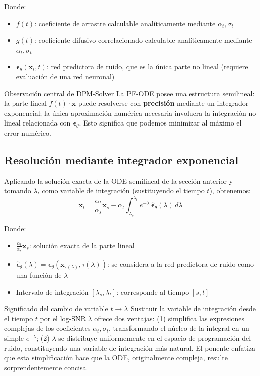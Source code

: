 \documentclass[a4paper]{article}
\begin{document}
Donde:
\begin{itemize}
    \item $f(t)$: coeficiente de arrastre calculable analíticamente mediante $\alpha_t, \sigma_t$
    \item $g(t)$: coeficiente difusivo correlacionado calculable analíticamente mediante $\alpha_t, \sigma_t$
    \item $\boldsymbol{\epsilon}_\theta(\mathbf{x}_t, t)$: red predictora de ruido, que es la única parte no lineal (requiere evaluación de una red neuronal)
\end{itemize}

\begin{importantbox}{Observación central de DPM-Solver}
La PF-ODE posee una estructura semilineal: la parte lineal $f(t) \cdot \mathbf{x}$ puede resolverse con \textbf{precisión} mediante un integrador exponencial; la única aproximación numérica necesaria involucra la integración no lineal relacionada con $\boldsymbol{\epsilon}_\theta$. Esto significa que podemos minimizar al máximo el error numérico.
\end{importantbox}

\subsection{Resolución mediante integrador exponencial}

Aplicando la solución exacta de la ODE semilineal de la sección anterior y tomando $\lambda_t$ como variable de integración (sustituyendo el tiempo $t$), obtenemos:
$$\mathbf{x}_t = \frac{\alpha_t}{\alpha_s} \mathbf{x}_s - \alpha_t \int_{\lambda_s}^{\lambda_t} e^{-\lambda}\, \hat{\boldsymbol{\epsilon}}_\theta(\lambda)\, d\lambda$$

Donde:
\begin{itemize}
    \item $\frac{\alpha_t}{\alpha_s} \mathbf{x}_s$: solución exacta de la parte lineal
    \item $\hat{\boldsymbol{\epsilon}}_\theta(\lambda) = \boldsymbol{\epsilon}_\theta(\mathbf{x}_{\tau(\lambda)}, \tau(\lambda))$: se considera a la red predictora de ruido como una función de $\lambda$
    \item Intervalo de integración $[\lambda_s, \lambda_t]$: corresponde al tiempo $[s, t]$
\end{itemize}

\begin{knowledgebox}{Significado del cambio de variable $t \to \lambda$}
Sustituir la variable de integración desde el tiempo $t$ por el log-SNR $\lambda$ ofrece dos ventajas: (1) simplifica las expresiones complejas de los coeficientes $\alpha_t, \sigma_t$, transformando el núcleo de la integral en un simple $e^{-\lambda}$; (2) $\lambda$ se distribuye uniformemente en el espacio de programación del ruido, constituyendo una variable de integración más natural. El ponente enfatiza que esta simplificación hace que la ODE, originalmente compleja, resulte sorprendentemente concisa.
\end{knowledgebox}
\end{document}

